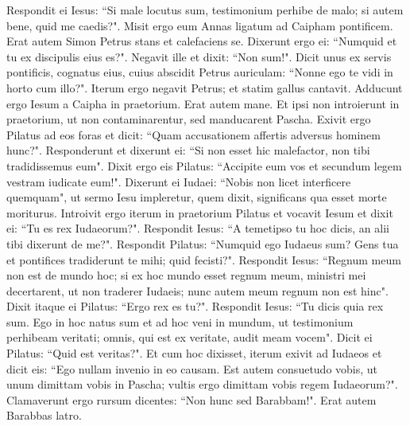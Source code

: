 \begin{biblechapter}
\verse Respondit ei Iesus: “Si male locutus sum, testimonium perhibe de malo; si autem bene, quid me caedis?". 
\verse Misit ergo eum Annas ligatum ad Caipham pontificem. 
\verse Erat autem Simon Petrus stans et calefaciens se. Dixerunt ergo ei: “Numquid et tu ex discipulis eius es?". Negavit ille et dixit: “Non sum!". 
\verse Dicit unus ex servis pontificis, cognatus eius, cuius abscidit Petrus auriculam: “Nonne ego te vidi in horto cum illo?". 
\verse Iterum ergo negavit Petrus; et statim gallus cantavit. 
\verse Adducunt ergo Iesum a Caipha in praetorium. Erat autem mane. Et ipsi non introierunt in praetorium, ut non contaminarentur, sed manducarent Pascha.  
\verse Exivit ergo Pilatus ad eos foras et dicit: “Quam accusationem affertis adversus hominem hunc?". 
\verse Responderunt et dixerunt ei: “Si non esset hic malefactor, non tibi tradidissemus eum". 
\verse Dixit ergo eis Pilatus: “Accipite eum vos et secundum legem vestram iudicate eum!". Dixerunt ei Iudaei: “Nobis non licet interficere quemquam", 
\verse ut sermo Iesu impleretur, quem dixit, significans qua esset morte moriturus. 
\verse Introivit ergo iterum in praetorium Pilatus et vocavit Iesum et dixit ei: “Tu es rex Iudaeorum?". 
\verse Respondit Iesus: “A temetipso tu hoc dicis, an alii tibi dixerunt de me?". 
\verse Respondit Pilatus: “Numquid ego Iudaeus sum? Gens tua et pontifices tradiderunt te mihi; quid fecisti?". 
\verse Respondit Iesus: “Regnum meum non est de mundo hoc; si ex hoc mundo esset regnum meum, ministri mei decertarent, ut non traderer Iudaeis; nunc autem meum regnum non est hinc". 
\verse Dixit itaque ei Pilatus: “Ergo rex es tu?". Respondit Iesus: “Tu dicis quia rex sum. Ego in hoc natus sum et ad hoc veni in mundum, ut testimonium perhibeam veritati; omnis, qui est ex veritate, audit meam vocem". 
\verse Dicit ei Pilatus: “Quid est veritas?". Et cum hoc dixisset, iterum exivit ad Iudaeos et dicit eis: “Ego nullam invenio in eo causam. 
\verse Est autem consuetudo vobis, ut unum dimittam vobis in Pascha; vultis ergo dimittam vobis regem Iudaeorum?". 
\verse Clamaverunt ergo rursum dicentes: “Non hunc sed Barabbam!". Erat autem Barabbas latro. 
\end{biblechapter}


